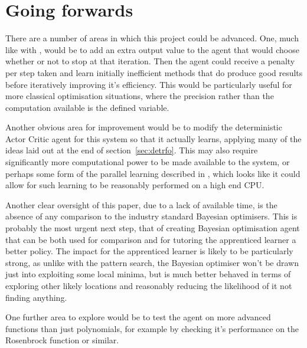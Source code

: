 \section{Going forwards}
There are a number of areas in which this project could be advanced. One, much like with \cite{RVA}, would be to add an extra output value to the agent that would choose whether or not to stop at that iteration. Then the agent could receive a penalty per step taken and learn initially inefficient methods that do produce good results before iteratively improving it's efficiency. This would be particularly useful for more classical optimisation situations, where the precision rather than the computation available is the defined variable.

Another obvious area for improvement would be to modify the deterministic Actor Critic agent for this system so that it actually learns, applying many of the ideas laid out at the end of section~\ref{sec:detrfo}. This may also require significantly more computational power to be made available to the system, or perhaps some form of the parallel learning described in \cite{mnih2016asynchronous}, which looks like it could allow for such learning to be reasonably performed on a high end CPU.

Another clear oversight of this paper, due to a lack of available time, is the absence of any comparison to the industry standard Bayesian optimisers. This is probably the most urgent next step, that of creating Bayesian optimisation agent that can be both used for comparison and for tutoring the apprenticed learner a better policy. The impact for the apprenticed learner is likely to be particularly strong, as unlike with the pattern search, the Bayesian optimiser won't be drawn just into exploiting some local minima, but is much better behaved in terms of exploring other likely locations and reasonably reducing the likelihood of it not finding anything.

One further area to explore would be to test the agent on more advanced functions than just polynomials, for example by checking it's performance on the Rosenbrock function or similar.